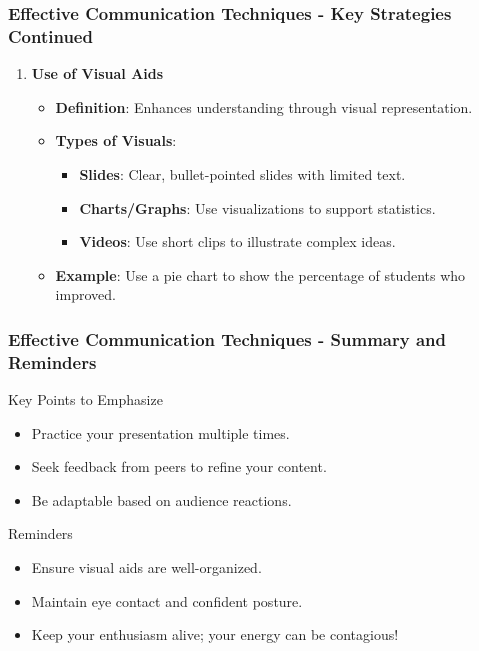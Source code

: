 \documentclass[aspectratio=169]{beamer}
\begin{document}
\begin{frame}[fragile]
    \frametitle{Effective Communication Techniques - Key Strategies Continued}
    \begin{enumerate}[resume]
        \item \textbf{Use of Visual Aids}
            \begin{itemize}
                \item \textbf{Definition}: Enhances understanding through visual representation.
                \item \textbf{Types of Visuals}:
                    \begin{itemize}
                        \item \textbf{Slides}: Clear, bullet-pointed slides with limited text.
                        \item \textbf{Charts/Graphs}: Use visualizations to support statistics.
                        \item \textbf{Videos}: Use short clips to illustrate complex ideas.
                    \end{itemize}
                \item \textbf{Example}: Use a pie chart to show the percentage of students who improved.
            \end{itemize}
    \end{enumerate}
\end{frame}

\begin{frame}[fragile]
    \frametitle{Effective Communication Techniques - Summary and Reminders}
    \begin{block}{Key Points to Emphasize}
        \begin{itemize}
            \item Practice your presentation multiple times.
            \item Seek feedback from peers to refine your content.
            \item Be adaptable based on audience reactions.
        \end{itemize}
    \end{block}
    
    \begin{block}{Reminders}
        \begin{itemize}
            \item Ensure visual aids are well-organized.
            \item Maintain eye contact and confident posture.
            \item Keep your enthusiasm alive; your energy can be contagious!
        \end{itemize}
    \end{block}
\end{frame}
\end{document}
